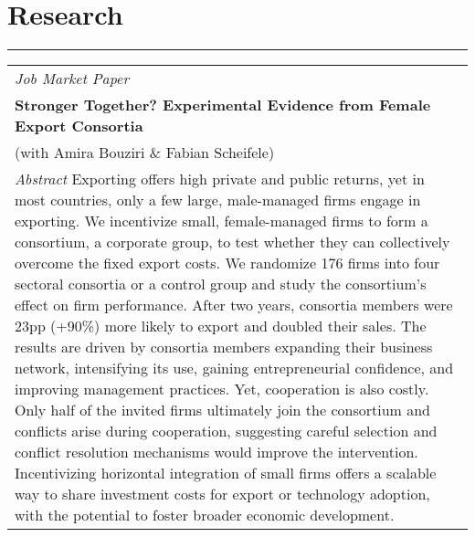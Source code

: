 \documentclass[10pt,a4paper]{article}
\begin{document}
\section*{Research}
\hrule
\vspace{1mm}

\begin{tabular}{@{}p{\textwidth}@{}}

\textit{\large Job Market Paper} \\
\vspace{0.1mm}
\hspace{5mm}\textbf{Stronger Together? Experimental Evidence from Female Export Consortia} \\
\hspace{5mm}(with Amira Bouziri \& Fabian Scheifele) \\
\hspace{5mm}\textit{Abstract} Exporting offers high private and public returns, yet in most countries, only a few large, male-managed firms engage in exporting. We incentivize small, female-managed firms to form a consortium, a corporate group, to test whether they can collectively overcome the fixed export costs. We randomize 176 firms into four sectoral consortia or a control group and study the consortium's effect on firm performance. After two years, consortia members were 23pp (+90\%) more likely to export and doubled their sales. The results are driven by consortia members expanding their business network, intensifying its use, gaining entrepreneurial confidence, and improving management practices. Yet, cooperation is also costly. Only half of the invited firms ultimately join the consortium and conflicts arise during cooperation, suggesting careful selection and conflict resolution mechanisms would improve the intervention. Incentivizing horizontal integration of small firms offers a scalable way to share investment costs for export or technology adoption, with the potential to foster broader economic development. \\

\end{tabular}
\end{document}
